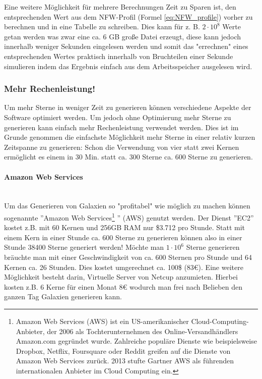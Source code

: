 Eine weitere Möglichkeit für mehrere Berechnungen Zeit zu Sparen ist, den
entsprechenden Wert aus dem NFW-Profil (Formel \ref{eq:NFW_profile}) vorher zu
berechnen und in eine Tabelle zu schreiben.
Dies kann für z. B. \( 2 \cdot 10^8 \) Werte getan werden was zwar eine ca. 6 GB große
Datei erzeugt, diese kann jedoch innerhalb weniger Sekunden eingelesen werden
und somit das "errechnen" eines entsprechenden Wertes praktisch innerhalb von
Bruchteilen einer Sekunde simulieren indem das Ergebnis einfach aus dem
Arbeitsspeicher ausgelesen wird.

\subsubsection{Mehr Rechenleistung!}

Um mehr Sterne in weniger Zeit zu generieren können verschiedene
Aspekte der Software optimiert werden. Um jedoch ohne Optimierung mehr Sterne
zu generieren kann einfach mehr Rechenleistung verwendet werden. Dies ist im
Grunde genommen die einfachste Möglichkeit mehr Sterne in einer relativ kurzen
Zeitspanne zu generieren: Schon die Verwendung von vier statt zwei Kernen
ermöglicht es einem in 30 Min. statt ca. 300 Sterne ca. 600 Sterne zu generieren.

\paragraph{Amazon Web Services} ~\\
Um das Generieren von Galaxien so "profitabel" wie möglich zu machen können
sogenannte ''Amazon Web Services\footnote{
Amazon Web Services (AWS) ist ein US-amerikanischer Cloud-Computing-Anbieter,
der 2006 als Tochterunternehmen des Online-Versandhändlers Amazon.com gegründet
wurde. Zahlreiche populäre Dienste wie beispielsweise Dropbox, Netflix,
Foursquare oder Reddit greifen auf die Dienste von Amazon Web Services zurück.
2013 stufte Gartner AWS als führenden internationalen Anbieter im Cloud
Computing ein.
} ''
(AWS) genutzt werden.
Der Dienst ''EC2'' kostet z.B. mit 60 Kernen und 256GB RAM nur \$3.712 pro Stunde.
Statt mit einem Kern in einer Stunde ca. 600 Sterne zu generieren können
also in einer Stunde 38400 Sterne generiert werden! Möchte man \( 1 \cdot
10 ^ 6 \) Sterne generieren bräuchte man mit einer Geschwindigkeit von
ca. 600 Sternen pro Stunde und 64 Kernen ca. 26 Stunden. Dies kostet umgerechnet
ca. 100\$ (83€).
Eine weitere Möglichkeit besteht darin, Virtuelle Server von Netcup anzumieten.
Hierbei kosten z.B. 6 Kerne für einen Monat 8€ wodurch man frei nach Belieben
den ganzen Tag Galaxien generieren kann.

